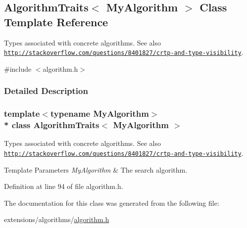 \hypertarget{classAlgorithmTraits}{}\subsection{Algorithm\+Traits$<$ My\+Algorithm $>$ Class Template Reference}
\label{classAlgorithmTraits}


Types associated with concrete algorithms. See also \href{http://stackoverflow.com/questions/8401827/crtp-and-type-visibility}{\tt http\+://stackoverflow.\+com/questions/8401827/crtp-\/and-\/type-\/visibility}.  




{\ttfamily \#include $<$algorithm.\+h$>$}



\subsubsection{Detailed Description}
\subsubsection*{template$<$typename My\+Algorithm$>$\\*
class Algorithm\+Traits$<$ My\+Algorithm $>$}

Types associated with concrete algorithms. See also \href{http://stackoverflow.com/questions/8401827/crtp-and-type-visibility}{\tt http\+://stackoverflow.\+com/questions/8401827/crtp-\/and-\/type-\/visibility}. 


\begin{DoxyTemplParams}{Template Parameters}
{\em My\+Algorithm} & The search algorithm. \\
\hline
\end{DoxyTemplParams}


Definition at line 94 of file algorithm.\+h.



The documentation for this class was generated from the following file\+:\begin{DoxyCompactItemize}
\item 
extensions/algorithms/\hyperlink{algorithm_8h}{algorithm.\+h}\end{DoxyCompactItemize}
